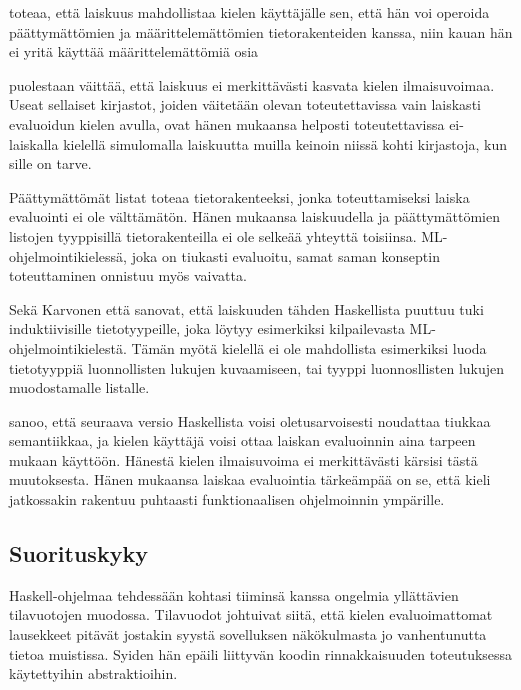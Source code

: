 \citet{haskellwikilaziness} toteaa, että laiskuus mahdollistaa kielen käyttäjälle sen, että hän voi operoida päättymättömien ja määrittelemättömien tietorakenteiden kanssa, niin kauan hän ei yritä käyttää määrittelemättömiä osia 

\citet{vesakarvonen} puolestaan väittää, että laiskuus ei merkittävästi kasvata kielen ilmaisuvoimaa. Useat sellaiset kirjastot, joiden väitetään olevan toteutettavissa vain laiskasti evaluoidun kielen avulla, ovat hänen mukaansa helposti toteutettavissa ei-laiskalla kielellä simulomalla laiskuutta muilla keinoin niissä kohti kirjastoja, kun sille on tarve.

Päättymättömät listat \citet{pointoflaziness} toteaa tietorakenteeksi, jonka toteuttamiseksi laiska evaluointi ei ole välttämätön. Hänen mukaansa laiskuudella ja päättymättömien listojen tyyppisillä tietorakenteilla ei ole selkeää yhteyttä toisiinsa. ML-ohjelmointikielessä, joka on tiukasti evaluoitu, samat saman konseptin toteuttaminen onnistuu myös vaivatta.

Sekä Karvonen että \citet{pointoflaziness} sanovat, että laiskuuden tähden Haskellista puuttuu tuki induktiivisille tietotyypeille, joka löytyy esimerkiksi kilpailevasta ML-ohjelmointikielestä. Tämän myötä kielellä ei ole mahdollista esimerkiksi luoda tietotyyppiä luonnollisten lukujen kuvaamiseen, tai tyyppi luonnosllisten lukujen muodostamalle listalle.

\citet{jonesretrospectiveonhaskell} sanoo, että seuraava versio Haskellista voisi oletusarvoisesti noudattaa tiukkaa semantiikkaa, ja kielen käyttäjä voisi ottaa laiskan evaluoinnin aina tarpeen mukaan käyttöön. Hänestä kielen ilmaisuvoima ei merkittävästi kärsisi tästä muutoksesta. Hänen mukaansa laiskaa evaluointia tärkeämpää on se, että kieli jatkossakin rakentuu puhtaasti funktionaalisen ohjelmoinnin ympärille.

\subsection{Suorituskyky}


Haskell-ohjelmaa tehdessään \citet{sampson2009experience} kohtasi tiiminsä kanssa ongelmia yllättävien tilavuotojen muodossa. Tilavuodot johtuivat siitä, että kielen evaluoimattomat lausekkeet pitävät jostakin syystä sovelluksen näkökulmasta jo vanhentunutta tietoa muistissa. Syiden hän epäili liittyvän koodin rinnakkaisuuden toteutuksessa käytettyihin abstraktioihin.

